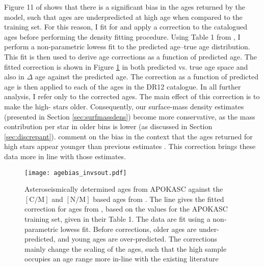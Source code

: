  Figure 11 of \citet{2016MNRAS.456.3655M} shows that there is a significant bias in the ages returned by the model, such that ages are underpredicted at high age when compared to the training set. For this reason, I fit for and apply a correction to the catalogued ages before performing the density fitting procedure. Using Table 1 from \citet{2016MNRAS.456.3655M}, I perform a non-parametric lowess fit to the predicted age--true age distribution. This fit is then used to derive age corrections as a function of predicted age. The fitted correction is shown in Figure \ref{fig:correction} in both predicted vs. true age space and also in $\Delta$ age against the predicted age. The correction as a function of predicted age is then applied to each of the ages in the DR12 catalogue. In all further analysis, I refer only to the corrected ages. The main effect of this correction is to make the high-\afe{} stars older. Consequently, our surface-mass density estimates (presented in Section \ref{sec:surfmassdens}) become more conservative, as the mass contribution per star in older bins is lower (as discussed in Section \ref{sec:discrepant}). \citet{2016MNRAS.456.3655M} comment on the bias in the context that the ages returned for high \afe{} stars appear younger than previous estimates \citep[from][]{2013A&A...560A.109H,2014A&A...562A..71B,2014A&A...565A..89B}. This correction brings these data more in line with those estimates.  
 
  \begin{figure}
 	\texttt{[image: agebias\_invsout.pdf]}
 	\centering
     \caption[Comparison between the input and output ages from \citet{2016MNRAS.456.3655M}, demonstrating the fit and correction which is applied to the age catalogue for APOGEE DR12]{Asteroseismically determined ages from APOKASC against the $\mathrm{[C/M]}$ and $\mathrm{[N/M]}$ based ages from \citet{2016MNRAS.456.3655M}. The line gives the fitted correction for ages from \citet{2016MNRAS.456.3655M}, based on the values for the APOKASC training set, given in their Table 1. The data are fit using a non-parametric lowess fit. Before corrections, older ages are under-predicted, and young ages are over-predicted. The corrections mainly change the scaling of the ages, such that the high \afe{} sample occupies an age range more in-line with the existing literature \citep[e.g.][]{2016arXiv160407771A,2013A&A...560A.109H} }
  \label{fig:correction}
\end{figure}



